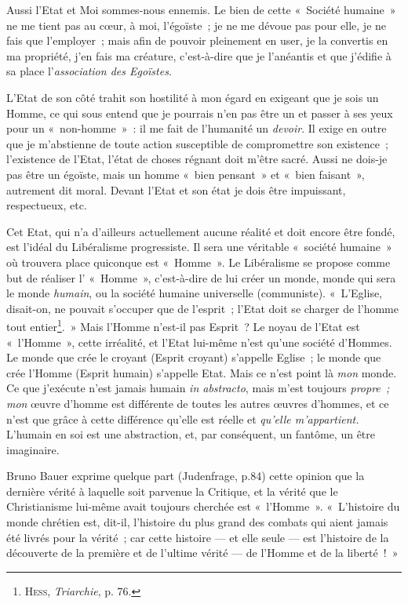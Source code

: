 \documentclass[french,twoside]{book} %
\begin{document}
Aussi l’Etat et Moi sommes-nous ennemis. Le bien de cette « Société humaine » ne me tient pas au cœur, à moi, l’égoïste ; je ne me dévoue pas pour elle, je ne fais que l’employer ; mais afin de pouvoir pleinement en user, je la convertis en ma propriété, j’en fais ma créature, c’est-à-dire que je l’anéantis et que j’édifie à sa place l’\emph{association des Egoïstes}.\par
L’Etat de son côté trahit son hostilité à mon égard en exigeant que je sois un Homme, ce qui sous entend que je pourrais n’en pas être un et passer à ses yeux pour un « non-homme » : il me fait de l’humanité un \emph{devoir}. Il exige en outre que je m’abstienne de toute action susceptible de compromettre son existence ; l’existence de l’Etat, l’état de choses régnant doit m’être sacré. Aussi ne dois-je pas être un égoïste, mais un homme « bien pensant » et « bien faisant », autrement dit moral. Devant l’Etat et son état je dois être impuissant, respectueux, etc.\par
 Cet Etat, qui n’a d’ailleurs actuellement aucune réalité et doit encore être fondé, est l’idéal du Libéralisme progressiste. Il sera une véritable « société humaine » où trouvera place quiconque est « Homme ». Le Libéralisme se propose comme but de réaliser l’ « Homme », c’est-à-dire de lui créer un monde, monde qui sera le monde \emph{humain}, ou la société humaine universelle (communiste). « L’Eglise, disait-on, ne pouvait s’occuper que de l’esprit ; l’Etat doit se charger de l’homme tout entier\footnote{ \noindent H{\scshape ess}, \emph{Triarchie}, p. 76.
 }. » Mais l’Homme n’est-il pas Esprit ? Le noyau de l’Etat est « l’Homme », cette irréalité, et l’Etat lui-même n’est qu’une société d’Hommes. Le monde que crée le croyant (Esprit croyant) s’appelle Eglise ; le monde que crée l’Homme (Esprit humain) s’appelle Etat. Mais ce n’est point là \emph{mon} monde. Ce que j’exécute n’est jamais humain \emph{in abstracto}, mais m’est toujours \emph{propre ; mon} œuvre d’homme est différente de toutes les autres œuvres d’hommes, et ce n’est que grâce à cette différence qu’elle est réelle et \emph{qu’elle m’appartient.} L’humain en soi est une abstraction, et, par conséquent, un fantôme, un être imaginaire.\par
Bruno Bauer exprime quelque part (Judenfrage, p.84) cette opinion que la dernière vérité à laquelle soit parvenue la Critique, et la vérité que le Christianisme lui-même avait toujours cherchée est « l’Homme ». « L’histoire du monde chrétien est, dit-il, l’histoire du plus grand des combats qui aient jamais été livrés pour la vérité ; car cette histoire — et elle seule — est l’histoire de la découverte de la première et de l’ultime vérité — de l’Homme et de la liberté ! »\par
\end{document}
